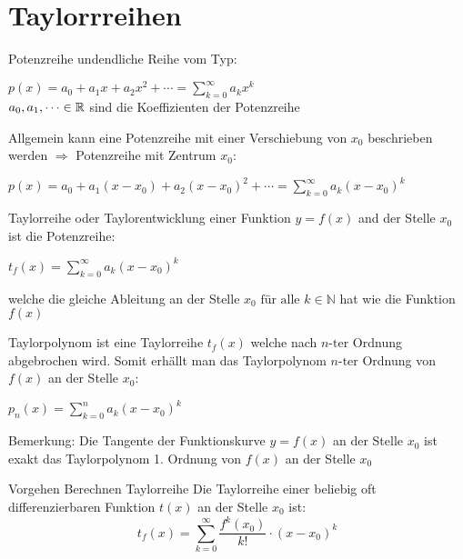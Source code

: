 \section{Taylorrreihen}

\begin{definition}{Potenzreihe} undendliche Reihe vom Typ:
    \begin{center}
    $p(x)=a_0+a_1x+a_2x^2+ \cdots = \sum_{k=0}^{\infty}{a_kx^k} $\\
    \vspace{2mm}
    \(a_0,a_1, \cdots \in \mathbb{R}\) sind die Koeffizienten der Potenzreihe
    \end{center}
    Allgemein kann eine Potenzreihe mit einer Verschiebung von \(x_0\) beschrieben werden $\Rightarrow$ Potenzreihe mit Zentrum \(x_0\):
    \begin{center}
    $p(x)=a_0+a_1(x-x_0)+a_2(x-x_0)^2+\cdots = \sum_{k=0}^{\infty}{a_k(x-x_0)^k}$
    \end{center}
\end{definition}

\begin{definition}{Taylorreihe} oder Taylorentwicklung einer Funktion \(y=f(x)\) and der Stelle \(x_0\) ist die Potenzreihe:
  \begin{center}
    $t_f(x)=\sum_{k=0}^{\infty}{a_k(x-x_0)^k}$
  \end{center}
  welche die gleiche Ableitung an der Stelle \(x_0 \text{ für alle }k\in \mathbb{N}\) hat wie die Funktion \(f(x)\)
\end{definition}

\begin{definition}{Taylorpolynom}
  ist eine Taylorreihe \(t_f(x)\) welche nach \(n\text{-ter}\) Ordnung abgebrochen wird.
        Somit erhällt man das Taylorpolynom \(n\text{-ter}\) Ordnung von \(f(x)\) an der Stelle \(x_0\):
    \begin{center}
    $p_n(x)=\sum_{k=0}^{n}{a_k(x-x_0)^k}$
    \end{center}
    Bemerkung: Die Tangente der Funktionskurve \(y=f(x) \) an der Stelle \(x_0\) ist exakt das Taylorpolynom 1.
      Ordnung von \(f(x)\) an der Stelle \(x_0\)
\end{definition}

\begin{KR}{Vorgehen Berechnen Taylorreihe}
  Die Taylorreihe einer beliebig oft differenzierbaren Funktion \(t(x)\) an der Stelle \(x_0\) ist:
  \[t_f(x) = \sum_{k=0}^{\infty}{\frac{f^{k}(x_0)}{k!}\cdot(x-x_0)^k}\]
\end{KR}

